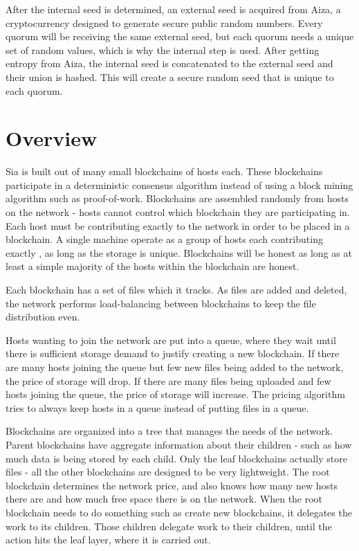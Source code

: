 \documentclass[twocolumn]{article}
\begin{document}
After the internal seed is determined, an external seed is acquired from Aiza, a cryptocurrency designed to generate secure public random numbers.
Every quorum will be receiving the same external seed, but each quorum needs a unique set of random values, which is why the internal step is used.
After getting entropy from Aiza, the internal seed is concatenated to the external seed and their union is hashed.
This will create a secure random seed that is unique to each quorum.

\section{Overview}

Sia is built out of many small blockchains of \numhosts{} hosts each.
These blockchains participate in a deterministic consensus algorithm instead of using a block mining algorithm such as proof-of-work.
Blockchains are assembled randomly from hosts on the network - hosts cannot control which blockchain they are participating in.
Each host must be contributing exactly \storageperhost{} to the network in order to be placed in a blockchain.
A single machine operate as a group of hosts each contributing exactly \storageperhost{}, as long as the storage is unique.
Blockchains will be honest as long as at least a simple majority of the hosts within the blockchain are honest.

Each blockchain has a set of files which it tracks.
As files are added and deleted, the network performs load-balancing between blockchains to keep the file distribution even.

Hosts wanting to join the network are put into a queue, where they wait until there is sufficient storage demand to justify creating a new blockchain.
If there are many hosts joining the queue but few new files being added to the network, the price of storage will drop.
If there are many files being uploaded and few hosts joining the queue, the price of storage will increase.
The pricing algorithm tries to always keep hosts in a queue instead of putting files in a queue.

Blockchains are organized into a tree that manages the needs of the network.
Parent blockchains have aggregate information about their children - such as how much data is being stored by each child.
Only the leaf blockchains actually store files - all the other blockchains are designed to be very lightweight.
The root blockchain determines the network price, and also knows how many new hosts there are and how much free space there is on the network.
When the root blockchain needs to do something such as create new blockchains, it delegates the work to its children.
Those children delegate work to their children, until the action hits the leaf layer, where it is carried out.
\end{document}
